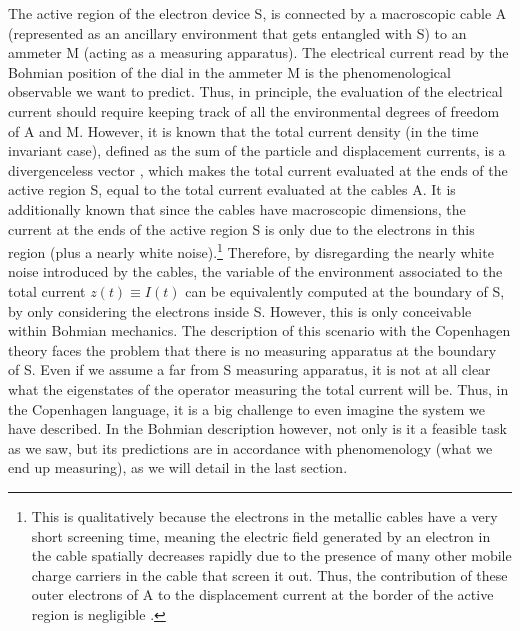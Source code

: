 \documentclass[11pt, a4paper]{article} %
\begin{document}
The active region of the electron device S, is connected by a macroscopic cable A (represented as an ancillary environment that gets entangled with S) to an ammeter M (acting as a measuring apparatus). The electrical current read by the Bohmian position of the dial in the ammeter M is the phenomenological observable we want to predict. Thus, in principle, the evaluation of the electrical current should require keeping track of all the environmental degrees of freedom of A and M. However, it is known that the total current density (in the time invariant case), defined as the sum of the particle and displacement currents, is a divergenceless vector \cite{diver1, diver2}, which makes the total current evaluated at the ends of the active region S, equal to the total current evaluated at the cables A. It is additionally known \cite{equiv} that since the cables have macroscopic dimensions, the current at the ends of the active region S is only due to the electrons in this region (plus a nearly white noise).\footnote{This is qualitatively because the electrons in the metallic cables have a very short screening time, meaning the electric field generated by an electron in the cable spatially decreases rapidly due to the presence of many other mobile charge carriers in the cable that screen it out. Thus, the contribution of these outer electrons of A to the displacement current at the border of the active region is negligible \cite{neg}.} Therefore, by disregarding the nearly white noise introduced by the cables, the variable of the environment associated to the total current $z(t)\equiv I(t)$ can be equivalently computed at the boundary of S, by only considering the electrons inside S. However, this is only conceivable within Bohmian mechanics. The description of this scenario with the Copenhagen theory faces the problem that there is no measuring apparatus at the boundary of S. Even if we assume a far from S measuring apparatus, it is not at all clear what the eigenstates of the operator measuring the total current will be. Thus, in the Copenhagen language, it is a big challenge to even imagine the system we have described. In the Bohmian description however, not only is it a feasible task as we saw, but its predictions are in accordance with phenomenology (what we end up measuring), as we will detail in the last section.
\end{document}
